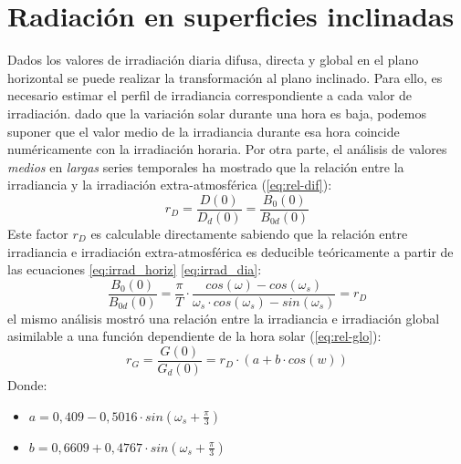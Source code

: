 \section{Radiación en superficies inclinadas}
\label{sec:orgb15c128}
\label{sec:radiacion-superficies-inclinadas}
Dados los valores de irradiación diaria difusa, directa y global en el plano horizontal se puede realizar la transformación al plano inclinado. Para ello, es necesario estimar el perfil de irradiancia correspondiente a cada valor de irradiación. dado que la variación solar durante una hora es baja, podemos suponer que el valor medio de la irradiancia durante esa hora coincide numéricamente con la irradiación horaria. Por otra parte, el análisis de valores \emph{medios}  en \emph{largas} series temporales ha mostrado que la relación entre la irradiancia y la irradiación extra-atmosférica \cite{Collares-Pereira.Rabl1979} (\ref{eq:rel-dif}):
\begin{equation}
r_D=\frac{D(0)}{D_d(0)}=\frac{B_0(0)}{B_{0d}(0)}
\label{eq:rel-dif}
\end{equation}
Este factor \(r_D\) es calculable directamente sabiendo que la relación entre irradiancia e irradiación extra-atmosférica es deducible teóricamente a partir de las ecuaciones \ref{eq:irrad_horiz} \ref{eq:irrad_dia}:
\begin{equation}
\frac{B_0(0)}{B_{0d}(0)}=\frac{\pi}{T}\cdot \frac{cos(\omega)-cos(\omega_s)}{\omega_s\cdot cos(\omega_s)-sin(\omega_s)}=r_D
\label{eq:rel-dif2}
\end{equation}
el mismo análisis mostró una relación entre la irradiancia e irradiación global asimilable a una función dependiente de la hora solar (\ref{eq:rel-glo}):
\begin{equation}
r_G=\frac{G(0)}{G_d(0)}=r_D\cdot(a+b\cdot cos(w))
\label{eq:rel-glo}
\end{equation}
Donde:
\begin{itemize}
\item \(a=0,409-0,5016\cdot sin(\omega_s+\frac{\pi}{3})\)
\item \(b=0,6609+0,4767\cdot sin(\omega_s+\frac{\pi}{3})\)
\end{itemize}

